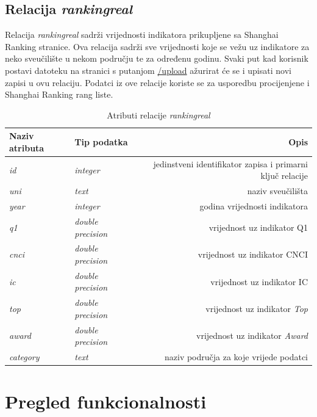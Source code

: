 \documentclass[times, utf8, zavrsni]{fer}
\begin{document}
           \newpage \section{Relacija \emph{rankingreal}}   
           Relacija \emph{rankingreal} sadrži vrijednosti indikatora prikupljene sa Shanghai Ranking stranice. Ova relacija sadrži sve 
           vrijednosti koje se vežu uz indikatore za neko sveučilište u nekom području te za određenu godinu. Svaki put kad korisnik 
           postavi datoteku na stranici s putanjom \url{/upload} ažurirat će se i upisati novi zapisi u ovu relaciju. Podatci iz ove 
           relacije koriste se za usporedbu procijenjene i Shanghai Ranking rang liste.
           \begin{table}[htb]
            \caption{Atributi relacije \emph{rankingreal}}
                \label{tbl:rankingreal}
                \centering
                \begin{tabular}{llr} \hline
                Naziv atributa & Tip podatka & Opis\\ \hline
                \emph{id} &  \emph{integer} & jedinstveni identifikator zapisa i primarni ključ relacije\\
                \emph{uni} &  \emph{text} & naziv sveučilišta\\
                \emph{year} &  \emph{integer} & godina vrijednosti indikatora\\
                \emph{q1} &  \emph{double precision} & vrijednost uz indikator Q1\\
                \emph{cnci} &  \emph{double precision} & vrijednost uz indikator CNCI\\
                \emph{ic} &  \emph{double precision} & vrijednost uz indikator IC\\
                \emph{top} &  \emph{double precision} & vrijednost uz indikator \emph{Top}\\
                \emph{award} &  \emph{double precision} & vrijednost uz indikator \emph{Award}\\
                \emph{category} &  \emph{text} & naziv područja za koje vrijede podatci\\
                \end{tabular}
                \end{table}
                \FloatBarrier 
\chapter{Pregled funkcionalnosti}
\end{document}
